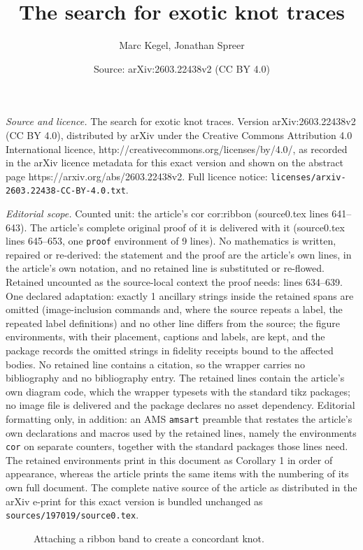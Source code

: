 \documentclass[10pt,a4paper]{amsart}
\title{The search for exotic knot traces}
\author{Marc Kegel, Jonathan Spreer}
\date{Source: arXiv:2603.22438v2 (CC BY 4.0)}
\begin{document}
\maketitle

\noindent\emph{Source and licence.} The search for exotic knot traces. Version arXiv:2603.22438v2 (CC BY 4.0), distributed by arXiv under the Creative Commons Attribution 4.0 International licence, http://creativecommons.org/licenses/by/4.0/, as recorded in the arXiv licence metadata for this exact version and shown on the abstract page https://arxiv.org/abs/2603.22438v2. Full licence notice: \texttt{licenses/arxiv-2603.22438-CC-BY-4.0.txt}.\par\smallskip

\noindent\textit{Editorial scope.} Counted unit: the article's cor cor:ribbon (source0.tex lines 641--643). The article's complete original proof of it is delivered with it (source0.tex lines 645--653, one \texttt{proof} environment of 9 lines). No mathematics is written, repaired or re-derived: the statement and the proof are the article's own lines, in the article's own notation, and no retained line is substituted or re-flowed.  Retained uncounted as the source-local context the proof needs: lines 634--639.  One declared adaptation: exactly 1 ancillary strings inside the retained spans are omitted (image-inclusion commands and, where the source repeats a label, the repeated label definitions) and no other line differs from the source; the figure environments, with their placement, captions and labels, are kept, and the package records the omitted strings in fidelity receipts bound to the affected bodies.  No retained line contains a citation, so the wrapper carries no bibliography and no bibliography entry.  The retained lines contain the article's own diagram code, which the wrapper typesets with the standard tikz packages; no image file is delivered and the package declares no asset dependency.  Editorial formatting only, in addition: an AMS \texttt{amsart} preamble that restates the article's own declarations and macros used by the retained lines, namely the environments \texttt{cor} on separate counters, together with the standard packages those lines need.  The retained environments print in this document as Corollary 1 in order of appearance, whereas the article prints the same items with the numbering of its own full document.  The complete native source of the article as distributed in the arXiv e-print for this exact version is bundled unchanged as \texttt{sources/197019/source0.tex}.
 \begin{figure}[htbp]
     \centering
       
     \caption{Attaching a ribbon band to create a concordant knot.}
     \label{fig:ribbon_band}
 \end{figure}
\end{document}
